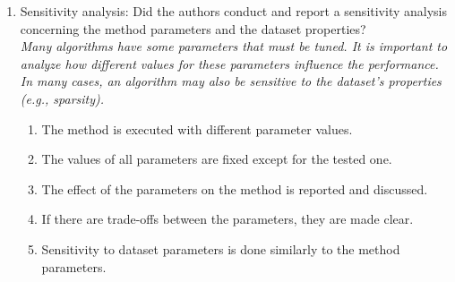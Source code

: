 \begin{enumerate}
    \item Sensitivity analysis: 
    Did the authors conduct and report a sensitivity analysis concerning the method parameters and the dataset properties? 
    \\ \emph{Many algorithms have some parameters that must be tuned. It is important to analyze how different values for these parameters influence the performance. In many cases, an algorithm may also be sensitive to the dataset's properties (e.g., sparsity).}
    \begin{enumerate} [label*=\arabic*.]
        \item The method is executed with different parameter values.
        \item The values of all parameters are fixed except for the tested one.
        \item The effect of the parameters on the method is reported and discussed.
        \item If there are trade-offs between the parameters, they are made clear.
        \item Sensitivity to dataset parameters is done similarly to the method parameters.
    \end{enumerate}
\end{enumerate}